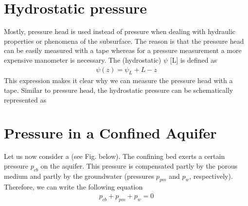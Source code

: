 \documentclass[letterpaper,10pt,english]{jupyterBook}
\let\sphinxpxdimen\pdfpxdimen\else\newdimen\sphinxpxdimen
\begin{document}
\section{Hydrostatic pressure}
\label{\detokenize{content/flow/L3/13_gw_storage:hydrostatic-pressure}}
\sphinxAtStartPar
Mostly, pressure head is used instead of pressure when dealing with hydraulic properties or phenomena of the subsurface. The reason is that the pressure head can be easily measured with a tape whereas for a pressure measurement a more expensive manometer is necessary. The (hydrostatic)  \(\psi\) {[}L{]} is defined as
\begin{equation*}
\begin{split}
\psi(z) = \psi_L + L - z
\end{split}
\end{equation*}
\sphinxAtStartPar
This expression makes it clear why we can measure the pressure head with a tape. Similar to pressure head, the hydrostatic pressure can be schematically represented as

\noindent{\hspace*{\fill}\sphinxincludegraphics[width=600\sphinxpxdimen]{{L03_f_12}.png}\hspace*{\fill}}


\section{Pressure in a Confined Aquifer}
\label{\detokenize{content/flow/L3/13_gw_storage:pressure-in-a-confined-aquifer}}
\sphinxAtStartPar
Let us now consider a  (see Fig. below). The confining bed exerts a certain pressure \(p_{cb}\) on the aquifer. This pressure is compensated partly by the porous medium and partly by the groundwater (pressures \(p_{pm}\) and \(p_w\), respectively). Therefore, we can write the following equation
\begin{equation*}
\begin{split}
p_{cb} + p_{pm} + p_w = 0
\end{split}
\end{equation*}
\noindent{\hspace*{\fill}\sphinxincludegraphics[width=600\sphinxpxdimen]{{L03_f_13}.png}\hspace*{\fill}}
\end{document}
